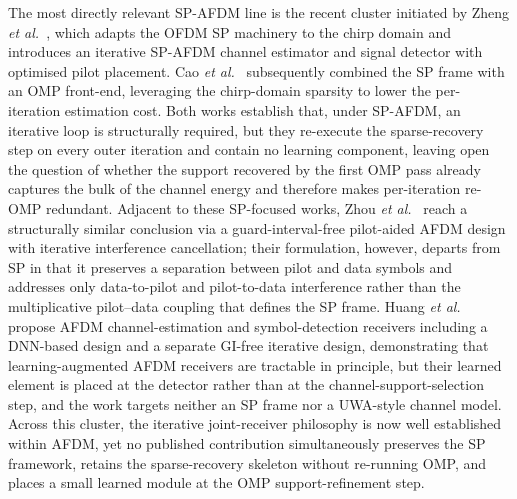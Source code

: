 The most directly relevant SP-AFDM line is the recent cluster initiated by
Zheng \emph{et al.}~\cite{qing2024spafdm}, which adapts the OFDM SP machinery
to the chirp domain and introduces an iterative SP-AFDM channel estimator
and signal detector with optimised pilot placement. Cao \emph{et
al.}~\cite{cao2024spomp} subsequently combined the SP frame with an OMP
front-end, leveraging the chirp-domain sparsity to lower the per-iteration
estimation cost. Both works establish that, under SP-AFDM, an iterative loop
is structurally required, but they re-execute the sparse-recovery step on
every outer iteration and contain no learning component, leaving open the
question of whether the support recovered by the first OMP pass already
captures the bulk of the channel energy and therefore makes per-iteration
re-OMP redundant. Adjacent to these SP-focused works, Zhou \emph{et
al.}~\cite{zhao2024gifreeafdm} reach a structurally similar conclusion via a
guard-interval-free pilot-aided AFDM design with iterative interference
cancellation; their formulation, however, departs from SP in that it
preserves a separation between pilot and data symbols and addresses only
data-to-pilot and pilot-to-data interference rather than the multiplicative
pilot--data coupling that defines the SP frame. Huang \emph{et
al.}~\cite{afdm2025jointcesd} propose AFDM channel-estimation and
symbol-detection receivers including a DNN-based design and a separate
GI-free iterative design, demonstrating that learning-augmented AFDM
receivers are tractable in principle, but their learned element is placed at
the detector rather than at the channel-support-selection step, and the work
targets neither an SP frame nor a UWA-style channel model. Across this cluster, the iterative joint-receiver
philosophy is now well established within AFDM, yet no published
contribution simultaneously preserves the SP framework, retains the
sparse-recovery skeleton without re-running OMP, and places a small learned
module at the OMP support-refinement step.

